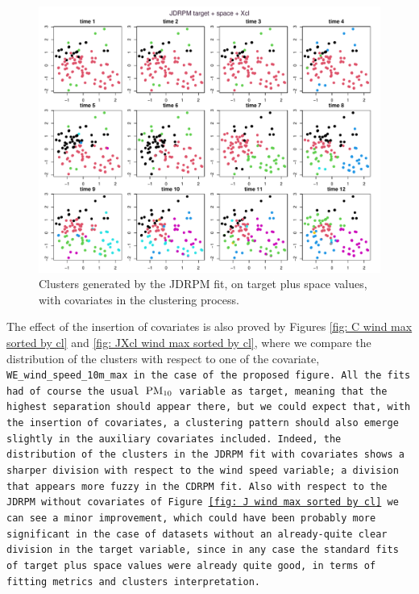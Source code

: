 \documentclass[12pt,	%
	a4paper,		%
	twoside,		%
	openright,		%
	titlepage,%
	]{book}
\theoremstyle{definition}
\begin{document}
\begin{figure}[!ht]
    \centering
    \includegraphics[width=1\linewidth]{Testing/Covariates/in clustering/space J Xcl/fitJDRPM target + space + Xcl_simple_map.pdf}
    \caption[Clusters generated by JDRPM fit, target plus space values, with covariates in the clustering process]{Clusters generated by the JDRPM fit, on target plus space values, with covariates in the clustering process.}
    \label{fig:simple map Jxcl}
\end{figure}


The effect of the insertion of covariates is also proved by Figures \ref{fig: C wind max sorted by cl} and \ref{fig: JXcl wind max sorted by cl}, where we compare the distribution of the clusters with respect to one of the covariate, \tt{WE\_wind\_speed\_10m\_max} in the case of the proposed figure. All the fits had of course the usual $\text{PM}_{10}$ variable as target, meaning that the highest separation should appear there, but we could expect that, with the insertion of covariates, a clustering pattern should also emerge slightly in the auxiliary covariates included. Indeed, the distribution of the clusters in the JDRPM fit with covariates shows a sharper division with respect to the wind speed variable; a division that appears more fuzzy in the CDRPM fit. Also with respect to the JDRPM without covariates of Figure \ref{fig: J wind max sorted by cl} we can see a minor improvement, which could have been probably more significant in the case of datasets without an already-quite clear division in the target variable, since in any case the standard fits of target plus space values were already quite good, in terms of fitting metrics and clusters interpretation.
\end{document}
